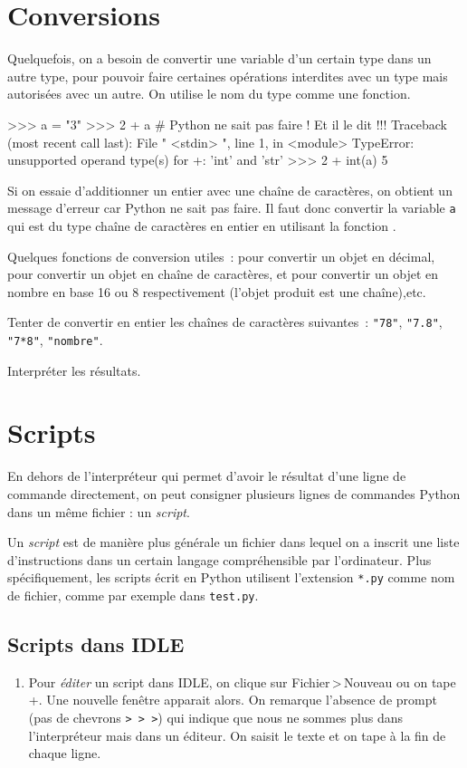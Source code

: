{\section{Conversions}
Quelquefois, on a besoin de convertir une variable d'un certain type dans un autre type,
pour pouvoir faire certaines opérations interdites avec un type mais autorisées avec un autre.
On utilise le nom du type comme une fonction.

\begin{pythoncode}
>>> a = "3"
>>> 2 + a          # Python ne sait pas faire ! Et il le dit !!!
Traceback (most recent call last):
  File " <stdin> ", line 1, in <module>
TypeError: unsupported operand type(s) for +: 'int' and 'str'
>>> 2 + int(a)
5
\end{pythoncode}
Si on essaie d'additionner un entier avec une chaîne de caractères, on obtient un message d'erreur
car Python ne sait pas faire. Il faut donc convertir la variable \texttt{a} qui est du type chaîne
de caractères en entier en utilisant la fonction .

Quelques fonctions de conversion utiles~:  pour convertir un objet en décimal,
 pour convertir un objet en chaîne de caractères,  et 
pour convertir un objet en nombre en base 16 ou 8 respectivement (l'objet produit est une chaîne),etc.

\begin{exercice}
Tenter de convertir en entier les chaînes de caractères suivantes~: \texttt{"78"}, \texttt{"7.8"},
 \texttt{"7*8"}, \texttt{"nombre"}.

 Interpréter les résultats.
\end{exercice}

\section{Scripts}
En dehors de l'interpréteur qui permet d'avoir le résultat d'une ligne de commande directement,
on peut consigner plusieurs lignes de commandes Python dans un même fichier : un \textit{script}.

Un \textit{script} est de manière plus générale un fichier dans lequel on a inscrit une liste
d'instructions dans un certain langage compréhensible par l'ordinateur. Plus spécifiquement,
les scripts écrit en Python utilisent l'extension \texttt{*.py} comme nom de fichier,
comme par exemple dans \texttt{test.py}.

\subsection{Scripts dans IDLE}
\begin{enumerate}
	\item Pour \textit{éditer} un script dans IDLE, on clique sur \textsf{Fichier\,>\,Nouveau} ou
on tape +. Une nouvelle fenêtre apparait alors. On remarque l'absence de prompt
(pas de chevrons \texttt{>\,>\,>}) qui indique que nous ne sommes plus dans l'interpréteur mais
dans un éditeur.
On saisit le texte et on tape  à la fin de chaque ligne.


\end{enumerate}}
